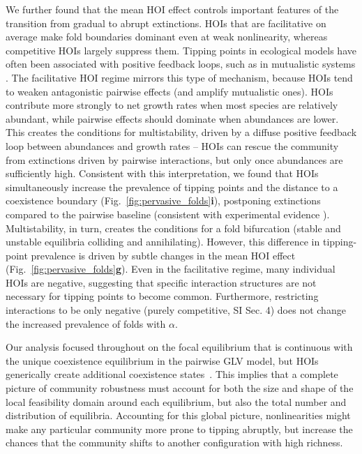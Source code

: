 \documentclass[
 reprint,
 amsmath,
 amssymb,
 aps,
 superscriptaddress,
]{revtex4-2}
\begin{document}
We further found that the mean HOI effect controls important features of the transition from gradual to abrupt extinctions. HOIs that are facilitative on average make fold boundaries dominant even at weak nonlinearity, whereas competitive HOIs largely suppress them. Tipping points in ecological models have often been associated with positive feedback loops, such as in mutualistic systems \cite{scheffer_catastrophic_2001, rietkerk_self-organized_2004}. The facilitative HOI regime mirrors this type of mechanism, because HOIs tend to weaken antagonistic pairwise effects (and amplify mutualistic ones). HOIs contribute more strongly to net growth rates when most species are relatively abundant, while pairwise effects should dominate when abundances are lower. This creates the conditions for multistability, driven by a diffuse positive feedback loop between abundances and growth rates -- HOIs can rescue the community from extinctions driven by pairwise interactions, but only once abundances are sufficiently high. Consistent with this interpretation, we found that HOIs simultaneously increase the prevalence of tipping points and the distance to a coexistence boundary (Fig.~\ref{fig:pervasive_folds}\textbf{i}), postponing extinctions compared to the pairwise baseline (consistent with experimental evidence \cite{wang_higher-order_2026}). Multistability, in turn, creates the conditions for a fold bifurcation (stable and unstable equilibria colliding and annihilating).  However, this difference in tipping-point prevalence is driven by subtle changes in the mean HOI effect (Fig.~\ref{fig:pervasive_folds}\textbf{g}). Even in the facilitative regime, many individual HOIs are negative, suggesting that specific interaction structures are not necessary for tipping points to become common. Furthermore, restricting interactions to be only negative (purely competitive, SI Sec. 4) does not change the increased prevalence of folds with $\alpha$.
 
Our analysis focused throughout on the focal equilibrium that is continuous with the unique coexistence equilibrium in the pairwise GLV model, but HOIs generically create additional coexistence states~\cite{aladwani_is_2019, aladwani_ecological_2020, gibbs_coexistence_2022}. This implies that a complete picture of community robustness must account for both the size and shape of the local feasibility domain around each equilibrium, but also the total number and distribution of equilibria. Accounting for this global picture, nonlinearities might make any particular community more prone to tipping abruptly, but increase the chances that the community shifts to another configuration with high richness. 
\end{document}

